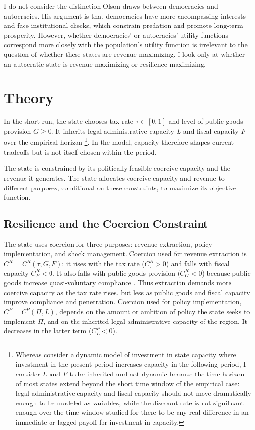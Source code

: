\documentclass[12pt]{article}
\begin{document}
I do not consider the distinction Olson \cite{olson1993} draws between democracies and autocracies. His argument is that democracies have more encompassing interests and face institutional checks, which constrain predation and promote long-term prosperity. However, whether democracies' or autocracies' utility functions correspond more closely with the population's utility function is irrelevant to the question of whether these states are revenue-maximizing. I look only at whether an autocratic state is revenue-maximizing or resilience-maximizing.

\section{Theory}

In the short-run, the state chooses tax rate $\tau \in [0,1]$ and level of public goods provision $G \ge 0$. It inherits legal-administrative capacity $L$ and fiscal capacity $F$ over the empirical horizon \footnote{Whereas \cite{besleyOriginsStateCapacity2009} consider a dynamic model of investment in state capacity where investment in the present period increases capacity in the following period, I consider $L$ and $F$ to be inherited and not dynamic because the time horizon of most states extend beyond the short time window of the empirical case: legal-administrative capacity and fiscal capacity should not move dramatically enough to be modeled as variables, while the discount rate is not significant enough over the time window studied for there to be any real difference in an immediate or lagged payoff for investment in capacity.}. In the model, capacity therefore shapes current tradeoffs but is not itself chosen within the period.

The state is constrained by its politically feasible coercive capacity and the revenue it generates. The state allocates coercive capacity and revenue to different purposes, conditional on these constraints, to maximize its objective function.

\subsection{Resilience and the Coercion Constraint}

The state uses coercion for three purposes: revenue extraction, policy implementation, and shock management. Coercion used for revenue extraction is $C^R = C^R(\tau,G,F)$: it rises with the tax rate ($C^R_{\tau} > 0$) and falls with fiscal capacity $C^R_F < 0$. It also falls with public-goods provision ($C^R_G < 0$) because public goods increase quasi-voluntary compliance \cite{levi1988}. Thus extraction demands more coercive capacity as the tax rate rises, but less as public goods and fiscal capacity improve compliance and penetration. Coercion used for policy implementation, $C^P = C^P(\Pi,L)$, depends on the amount or ambition of policy the state seeks to implement $\Pi$, and on the inherited legal-administrative capacity of the region. It decreases in the latter term ($C^P_L < 0$).
\end{document}
